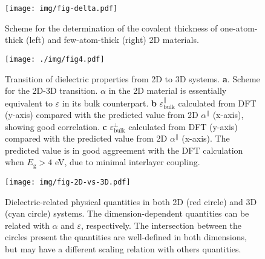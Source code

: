 \documentclass[journal=ancac3,manuscript=article,email=true,hyperref=true,keywords=false]{achemso}
\begin{document}
\begin{figure}[htbp]
\centering
\texttt{[image: img/fig-delta.pdf]}
\caption{\label{fig-delta} Scheme for the determination of the
  covalent thickness of one-atom-thick (left) and few-atom-thick
  (right) 2D materials.}
\end{figure}

\begin{figure}[htbp]
\centering
\texttt{[image: ./img/fig4.pdf]}
\caption{\label{fig-4} Transition of dielectric properties from 2D to
  3D systems. \textbf{a}. Scheme for the 2D-3D transition. $\alpha$ in
  the 2D material is essentially equivalent to $\varepsilon$ in its
  bulk counterpart. \textbf{b}
  $\varepsilon_{\mathrm{bulk}}^{\parallel}$ calculated from DFT
  (y-axis) compared with the predicted value from 2D
  $\alpha^{\parallel}$ (x-axis), showing good correlation. \textbf{c}
  $\varepsilon_{\mathrm{bulk}}^{\perp}$ calculated from DFT (y-axis)
  compared with the predicted value from 2D $\alpha^{\parallel}$
  (x-axis). The predicted value is in good aggreement with the DFT
  calculation when $E_{\mathrm{g}}>4$ eV, due to minimal interlayer
  coupling. }
\end{figure}

\begin{figure}[htbp]
\centering
\texttt{[image: img/fig-2D-vs-3D.pdf]}
\caption{\label{fig-2D-3D} Dielectric-related physical quantities in
  both 2D (red circle) and 3D (cyan circle) systems. The
  dimension-dependent quantities can be related with $\alpha$ and
  $\varepsilon$, respectively. The intersection between the circles
  present the quantities are well-defined in both dimensions, but may have a
  different scaling relation with others quantities.}
\end{figure}
\end{document}
